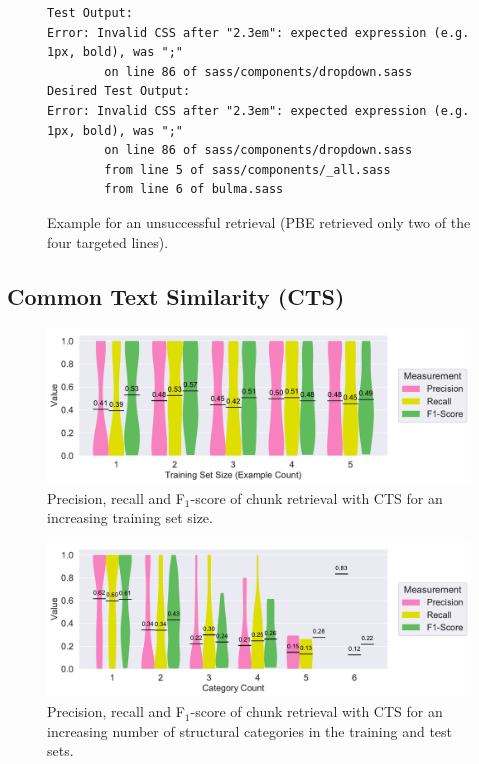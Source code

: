 \begin{figure}[!t]
  \centering
  \begin{lstlisting}[breaklines=true]
Test Output:
Error: Invalid CSS after "2.3em": expected expression (e.g. 1px, bold), was ";"
        on line 86 of sass/components/dropdown.sass   
Desired Test Output:
Error: Invalid CSS after "2.3em": expected expression (e.g. 1px, bold), was ";"
        on line 86 of sass/components/dropdown.sass
        from line 5 of sass/components/_all.sass
        from line 6 of bulma.sass
  \end{lstlisting}  
  \caption{Example for an unsuccessful retrieval (PBE retrieved only two of the four targeted lines).}
  \label{lst:pbe-unsuccessful}
\end{figure}


\subsection{Common Text Similarity (CTS)}

\begin{figure}[!t]
		\centering
		\includegraphics[width=\columnwidth, clip]{img/big-study/recall-precision-examplecount-CTS.pdf}
		\caption{Precision, recall and F$_{1}$-score of chunk retrieval with CTS for an increasing training set size.}
		\label{fig:recall-precision-examplecount-CTS}
\end{figure}

\begin{figure}[!t]
		\centering
		\includegraphics[width=\columnwidth, clip]{img/big-study/recall-precision-categorycount-CTS.pdf}
		\caption{Precision, recall and F$_{1}$-score of chunk retrieval with CTS for an increasing number of structural categories in the training and test sets.}
		\label{fig:recall-precision-categorycount-CTS}
\end{figure}

